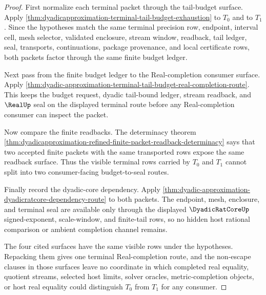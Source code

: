 \begin{proof}
First normalize each terminal packet through the tail-budget surface. Apply \autoref{thm:dyadicapproximation-terminal-tail-budget-exhaustion} to $T_0$ and to $T_1$. Since the hypotheses match the same terminal precision row, endpoint, interval cell, mesh selector, validated enclosure, stream window, readback, tail ledger, seal, transports, continuations, package provenance, and local certificate rows, both packets factor through the same finite budget ledger.

Next pass from the finite budget ledger to the Real-completion consumer surface. Apply \autoref{thm:dyadic-approximation-terminal-tail-budget-real-completion-route}. This keeps the budget request, dyadic tail-bound ledger, stream readback, and $\RealUp$ seal on the displayed terminal route before any Real-completion consumer can inspect the packet.

Now compare the finite readbacks. The determinacy theorem \autoref{thm:dyadicapproximation-refined-finite-packet-readback-determinacy} says that two accepted finite packets with the same transported rows expose the same readback surface. Thus the visible terminal rows carried by $T_0$ and $T_1$ cannot split into two consumer-facing budget-to-seal routes.

Finally record the dyadic-core dependency. Apply \autoref{thm:dyadic-approximation-dyadicratcore-dependency-route} to both packets. The endpoint, mesh, enclosure, and terminal seal are available only through the displayed $\DyadicRatCoreUp$ signed-exponent, scale-window, and finite-tail rows, so no hidden host rational comparison or ambient completion channel remains.

The four cited surfaces have the same visible rows under the hypotheses. Repacking them gives one terminal Real-completion route, and the non-escape clauses in those surfaces leave no coordinate in which completed real equality, quotient streams, selected host limits, solver oracles, metric-completion objects, or host real equality could distinguish $T_0$ from $T_1$ for any consumer.
\end{proof}
